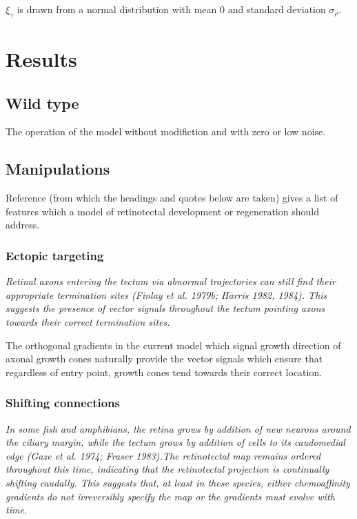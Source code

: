 \documentclass[11pt, a4paper]{article}
\begin{document}
$\xi_\gamma$ is drawn from a normal distribution with mean 0 and standard
deviation $\sigma_\rho$.

\section{Results}

\subsection{Wild type}

The operation of the model without modifiction and with zero or low noise.

\subsection{Manipulations}

Reference \cite{goodhill_development_2005} (from which the headings and quotes
below are taken) gives a list of features which a model of retinotectal
development or regeneration should address.

\subsubsection{Ectopic targeting}

\begin{displayquote}
\emph{Retinal axons entering the tectum via abnormal trajectories can still find
their appropriate termination sites (Finlay et al. 1979b; Harris 1982,
1984). This suggests the presence of vector signals throughout the tectum
pointing axons towards their correct termination sites.}
\end{displayquote}

The orthogonal gradients in the current model which signal growth direction of
axonal growth cones naturally provide the vector signals which ensure that
regardless of entry point, growth cones tend towards their correct location.

\subsubsection{Shifting connections}

\begin{displayquote}
\emph{In some fish and amphibians, the retina grows by addition of new neurons
around the ciliary margin, while the tectum grows by addition of cells to its
caudomedial edge (Gaze et al. 1974; Fraser 1983).The retinotectal map remains
ordered throughout this time, indicating that the retinotectal projection is
continually shifting caudally. This suggests that, at least in these species,
either chemoaffinity gradients do not irreversibly specify the map or the
gradients must evolve with time.}
\end{displayquote}
\end{document}
